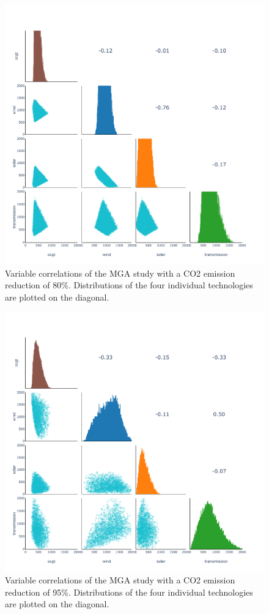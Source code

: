 \begin{figure}[p]\center
	\includegraphics[width=1.2\textwidth,trim={0 0cm 0 0cm},clip]{./Images/corelation_4D_80}
	\caption{Variable correlations of the MGA study with a CO2 emission reduction of 80\%. Distributions of the four individual technologies are plotted on the diagonal.}

\end{figure}

\begin{figure}[p]\center
	\includegraphics[width=1.2\textwidth,trim={0 0cm 0 0cm},clip]{./Images/corelation_4D}
	\caption{Variable correlations of the MGA study with a CO2 emission reduction of 95\%. Distributions of the four individual technologies are plotted on the diagonal.}

\end{figure}





